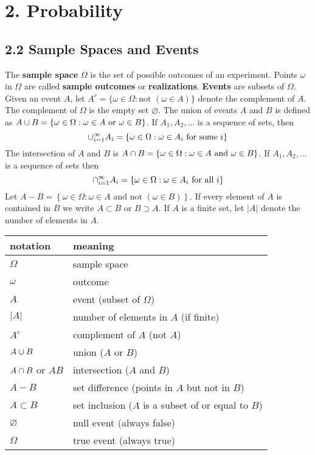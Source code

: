 \section*{2. Probability}\label{probability}

\subsection*{2.2 Sample Spaces and Events}\label{sample-spaces-and-events}
The \textbf{sample space} \(\Omega\) is the set of possible outcomes of an experiment. Points \(\omega\) in \(\Omega\) are called \textbf{sample outcomes} or \textbf{realizations}. \textbf{Events} are subsets of \(\Omega\).
Given an event \(A\), let \(A^{c} = \{ \omega \in \Omega : \text{not } (\omega \in A) \}\) denote the complement of \(A\). The complement of \(\Omega\) is the empty set \(\varnothing\). The union of events \(A\) and \(B\) is defined as \(A \cup B = \{ \omega \in \Omega : \omega \in A \text{ or } \omega \in B \}\). If \(A_{1}, A_{2}, \dots\) is a sequence of sets, then
\[
\union_{i=1}^{\infty} A_{i} = \left\{ \omega \in \Omega : \omega \in A_{i} \text{ for some } i \right\}
\]
The intersection of \(A\) and \(B\) is 
\(A \cap B = \{ \omega \in \Omega : \omega \in A \text{ and } \omega \in B \}\).
If \(A_{1}, A_{2}, \dots\) is a sequence of sets then
\[
\inter_{i=1}^{\infty} A_{i} = \left\{ \omega \in \Omega : \omega \in A_{i} \text{ for all } i \right\}
\]
Let
\(A - B = \left\{ \omega \in \Omega : \omega \in A \text{ and not } (\omega \in B) \right\}\).
If every element of \(A\) is contained in \(B\) we write \(A \subset B\) or \(B \supset A\). If \(A\) is a finite set, let \(|A|\) denote the number of elements in \(A\).
\begin{table}[H]
\centering
\begin{tabular}{@{}p{5cm}p{10cm}@{}}
\toprule
notation &  meaning  \\
\midrule
\(\Omega\) & sample space \\
\(\omega\) & outcome \\
\(A\) & event (subset of \(\Omega\)) \\
\(\vert A \vert\) & number of elements in \(A\) (if finite) \\
\(A^{c}\) & complement of \(A\) (not \(A\)) \\
\(A \cup B\) & union (\(A\) or \(B\)) \\
\(A \cap B\) or \(AB\) & intersection (\(A\) and \(B\)) \\
\(A - B\) & set difference (points in \(A\) but not in \(B\)) \\
\(A \subset B\) & set inclusion (\(A\) is a subset of or equal to
\(B\)) \\
\(\varnothing\) & null event (always false) \\
\(\Omega\) & true event (always true) \\
\bottomrule
\end{tabular}
\end{table}
